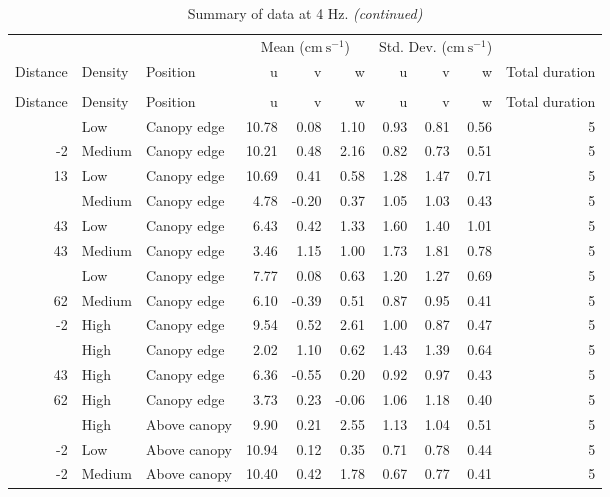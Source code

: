 \documentclass[10pt,]{article}
\begin{document}
\begin{longtable}{rllrrrrrrr}
\caption{\label{tab:unnamed-chunk-2}Summary of data at 4 Hz.}\\
\toprule
\multicolumn{3}{c}{ } & \multicolumn{3}{c}{Mean ($\text{cm}~\text{s}^{-1}$)} & \multicolumn{3}{c}{Std. Dev. ($\text{cm}~\text{s}^{-1}$)} \\
\cmidrule(l{2pt}r{2pt}){4-6} \cmidrule(l{2pt}r{2pt}){7-9}
Distance & Density & Position & u & v & w & u & v & w & Total duration\\
\midrule
\endfirsthead
\caption[]{\label{tab:unnamed-chunk-2}Summary of data at 4 Hz. \textit{(continued)}}\\
\toprule
Distance & Density & Position & u & v & w & u & v & w & Total duration\\
\midrule
\endhead
\
\endfoot
\bottomrule
\endlastfoot
-2 & Low & Canopy edge & 10.78 & 0.08 & 1.10 & 0.93 & 0.81 & 0.56 & 5\\
-2 & Medium & Canopy edge & 10.21 & 0.48 & 2.16 & 0.82 & 0.73 & 0.51 & 5\\
13 & Low & Canopy edge & 10.69 & 0.41 & 0.58 & 1.28 & 1.47 & 0.71 & 5\\
\addlinespace
13 & Medium & Canopy edge & 4.78 & -0.20 & 0.37 & 1.05 & 1.03 & 0.43 & 5\\
43 & Low & Canopy edge & 6.43 & 0.42 & 1.33 & 1.60 & 1.40 & 1.01 & 5\\
43 & Medium & Canopy edge & 3.46 & 1.15 & 1.00 & 1.73 & 1.81 & 0.78 & 5\\
\addlinespace
62 & Low & Canopy edge & 7.77 & 0.08 & 0.63 & 1.20 & 1.27 & 0.69 & 5\\
62 & Medium & Canopy edge & 6.10 & -0.39 & 0.51 & 0.87 & 0.95 & 0.41 & 5\\
-2 & High & Canopy edge & 9.54 & 0.52 & 2.61 & 1.00 & 0.87 & 0.47 & 5\\
\addlinespace
13 & High & Canopy edge & 2.02 & 1.10 & 0.62 & 1.43 & 1.39 & 0.64 & 5\\
43 & High & Canopy edge & 6.36 & -0.55 & 0.20 & 0.92 & 0.97 & 0.43 & 5\\
62 & High & Canopy edge & 3.73 & 0.23 & -0.06 & 1.06 & 1.18 & 0.40 & 5\\
\addlinespace
-2 & High & Above canopy & 9.90 & 0.21 & 2.55 & 1.13 & 1.04 & 0.51 & 5\\
-2 & Low & Above canopy & 10.94 & 0.12 & 0.35 & 0.71 & 0.78 & 0.44 & 5\\
-2 & Medium & Above canopy & 10.40 & 0.42 & 1.78 & 0.67 & 0.77 & 0.41 & 5\\

\end{longtable}
\end{document}
